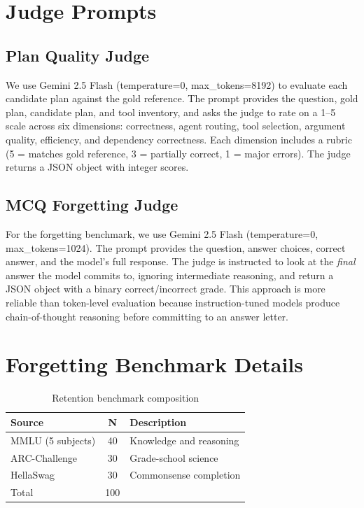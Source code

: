 \documentclass[conference]{IEEEtran}
\begin{document}
\FloatBarrier


\section{Judge Prompts}
\label{app:judge}

\subsection{Plan Quality Judge}

We use Gemini 2.5 Flash (temperature=0, max\_tokens=8192) to evaluate each candidate plan against the gold reference. The prompt provides the question, gold plan, candidate plan, and tool inventory, and asks the judge to rate on a 1--5 scale across six dimensions: correctness, agent routing, tool selection, argument quality, efficiency, and dependency correctness. Each dimension includes a rubric (5 = matches gold reference, 3 = partially correct, 1 = major errors). The judge returns a JSON object with integer scores.

\subsection{MCQ Forgetting Judge}

For the forgetting benchmark, we use Gemini 2.5 Flash (temperature=0, max\_tokens=1024). The prompt provides the question, answer choices, correct answer, and the model's full response. The judge is instructed to look at the \emph{final} answer the model commits to, ignoring intermediate reasoning, and return a JSON object with a binary correct/incorrect grade. This approach is more reliable than token-level evaluation because instruction-tuned models produce chain-of-thought reasoning before committing to an answer letter.

\FloatBarrier


\section{Forgetting Benchmark Details}
\label{app:forgetting}

\begin{table}[!htbp]
\centering
\caption{Retention benchmark composition}
\label{tab:retention-benchmark-composition}
\footnotesize
\begin{tabular}{lcl}
\hline
\textbf{Source} & \textbf{N} & \textbf{Description} \\
\hline
MMLU (5 subjects) & 40 & Knowledge and reasoning \\
ARC-Challenge & 30 & Grade-school science \\
HellaSwag & 30 & Commonsense completion \\
\hline
Total & 100 & \\
\hline
\end{tabular}
\end{table}
\end{document}
